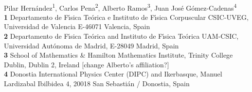 \documentclass[10pt,letterpaper]{article}
\newcommand{\mychange}[2]{\textcolor[rgb]{0.75,0,0}{\st{#1} {#2}}}
\begin{document}
\vspace*{0.2in}

\begin{flushleft}
{\Large
\textbf{} %
}
\newline
\\
Pilar Hern\'andez\textsuperscript{1},
Carlos Pena\textsuperscript{2},
Alberto Ramos\textsuperscript{3},
Juan Jos\'e G\'omez-Cadenas\textsuperscript{4}
\\
\bigskip
\textbf{1} Departamento de F\'{\i}sica Te\'orica e Instituto de F\'{\i}sica Corpuscular CSIC-UVEG, Universidad de Valencia  
 E-46071 Valencia, Spain
 \\
\textbf{2} Departamento de F\'{\i}sica Te\'orica and Instituto de F\'{\i}sica Te\'orica UAM-CSIC,
Universidad Aut\'onoma de Madrid, E-28049 Madrid, Spain
\\
\textbf{3} School of Mathematics \& Hamilton Mathematics Institute, Trinity College Dublin, Dublin
 2, Ireland \mychange{}{[change Alberto's affiliation?]}
 \\
 \textbf{4} Donostia International Physics Center (DIPC) and Ikerbasque, Manuel Lardizabal Ibilbidea 4, 20018 San Sebasti\'an / Donostia, Spain
\bigskip

% 
%






\end{flushleft}
\end{document}
